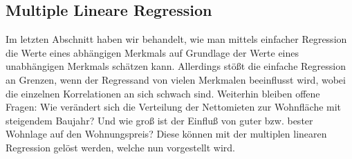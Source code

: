 \subsection{Multiple Lineare Regression}
\label{sec:mult_reg}


Im letzten Abschnitt haben wir behandelt, wie man mittels einfacher Regression die Werte eines abhängigen Merkmals auf Grundlage der Werte eines unabhängigen Merkmals schätzen kann.
Allerdings stößt die einfache Regression an Grenzen, wenn der Regressand von vielen Merkmalen beeinflusst wird, wobei die einzelnen Korrelationen an sich schwach sind.
Weiterhin bleiben offene Fragen: 
Wie verändert sich die Verteilung der Nettomieten zur Wohnfläche mit steigendem Baujahr?
Und wie groß ist der Einfluß von guter bzw. bester Wohnlage auf den Wohnungspreis? 
Diese können mit der multiplen linearen Regression gelöst werden, welche nun vorgestellt wird.


